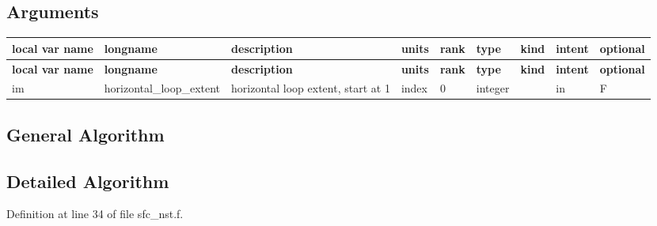 \hypertarget{group___g_f_s___n_s_s_t_arg_table_NSST_run}{}\subsection{Arguments}\label{group___g_f_s___n_s_s_t_arg_table_NSST_run}
\tabulinesep=1mm
\begin{longtabu} spread 0pt [c]{*{9}{|X[-1]}|}
\hline
\rowcolor{\tableheadbgcolor}\textbf{ local var name }&\textbf{ longname }&\textbf{ description }&\textbf{ units }&\textbf{ rank }&\textbf{ type }&\textbf{ kind }&\textbf{ intent }&\textbf{ optional  }\\
\endfirsthead
\hline
\endfoot
\hline
\rowcolor{\tableheadbgcolor}\textbf{ local var name }&\textbf{ longname }&\textbf{ description }&\textbf{ units }&\textbf{ rank }&\textbf{ type }&\textbf{ kind }&\textbf{ intent }&\textbf{ optional  }\\
\endhead
im &horizontal\+\_\+loop\+\_\+extent &horizontal loop extent, start at 1 &index &0 &integer &&in &F \\
\end{longtabu}
\hypertarget{group___g_f_s___n_s_s_t_general}{}\subsection{General Algorithm}\label{group___g_f_s___n_s_s_t_general}
\hypertarget{group___g_f_s___n_s_s_t_detailed}{}\subsection{Detailed Algorithm}\label{group___g_f_s___n_s_s_t_detailed}


Definition at line 34 of file sfc\+\_\+nst.\+f.


